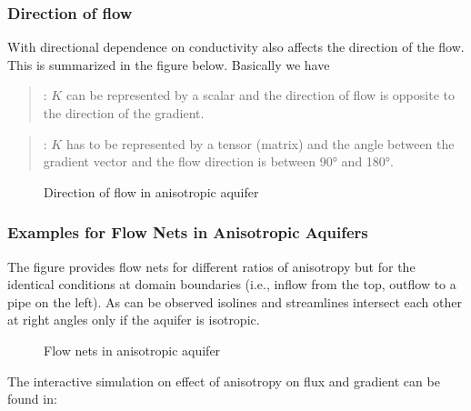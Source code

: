\documentclass[letterpaper,10pt,english]{sphinxmanual}
\begin{document}
\subsubsection{Direction of flow}
\label{\detokenize{contents/flow/lecture_06/16_darcy_law_3D:direction-of-flow}}
With directional dependence on conductivity also affects the direction of the flow. This is summarized in the figure below. Basically we have
\begin{quote}

: \(K\) can be represented by a scalar and the direction of flow is opposite to the direction of the gradient.
\end{quote}
\begin{quote}

: \(K\) has to be represented by a tensor (matrix) and the angle between the gradient vector and the flow direction is between 90° and 180°.
\end{quote}

\begin{figure}[htbp]
\centering
\capstart

\noindent{}
\caption{Direction of flow in anisotropic aquifer}\label{\detokenize{contents/flow/lecture_06/16_darcy_law_3D:aniso-dir}}\end{figure}


\subsubsection{Examples for Flow Nets in Anisotropic Aquifers}
\label{\detokenize{contents/flow/lecture_06/16_darcy_law_3D:examples-for-flow-nets-in-anisotropic-aquifers}}
The figure provides flow nets for different ratios of anisotropy but for the identical conditions at domain boundaries (i.e., inflow from the top, outflow to a pipe on the left). As can be observed isolines and streamlines intersect each other at right angles only if the aquifer is isotropic.

\begin{figure}[htbp]
\centering
\capstart

\noindent{}
\caption{Flow nets in anisotropic aquifer}\label{\detokenize{contents/flow/lecture_06/16_darcy_law_3D:flow-net-aniso}}\end{figure}

The interactive simulation on effect of anisotropy on flux and gradient can be found in:
{\hyperref[\detokenize{contents/tools/aniso2D::doc}]{}}
\end{document}

